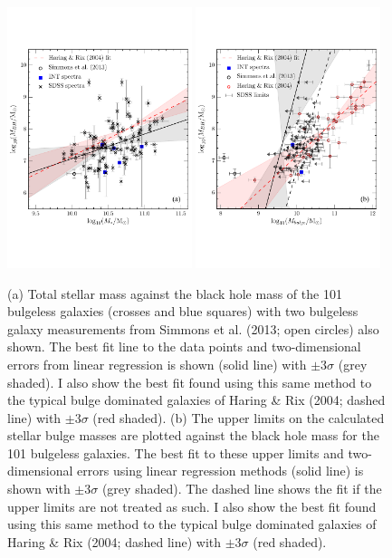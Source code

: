 \documentclass[12pt]{article}
\begin{document}
\begin{figure}
\centering
\includegraphics[width=0.48\textwidth]{mass_bh_total_mass_fit_linmix_fit.pdf}
\includegraphics[width=0.48\textwidth]{mass_bh_bulge_limits_INT_simmons13_measurements_linmix_fit.pdf}
\caption{(a) Total stellar mass against the black hole mass of the 101 bulgeless galaxies (crosses and blue squares) with two bulgeless galaxy measurements from Simmons et al. (2013; open circles) also shown. The best fit line to the data points and two-dimensional errors from linear regression is shown (solid line) with $\pm3\sigma$ (grey shaded). I also show the best fit found using this same method to the typical bulge dominated galaxies of Haring \& Rix (2004; dashed line) with $\pm3\sigma$ (red shaded). (b) The upper limits on the calculated stellar bulge masses are plotted against the black hole mass for the 101 bulgeless galaxies. The best fit to these upper limits and two-dimensional errors using linear regression methods (solid line) is shown with $\pm3\sigma$ (grey shaded). The dashed line shows the fit if the upper limits are not treated as such. I also show the best fit found using this same method to the typical bulge dominated galaxies of Haring \& Rix (2004; dashed line) with $\pm3\sigma$ (red shaded).
}
\label{fig:bulgevsbh}
\end{figure}
\end{document}

